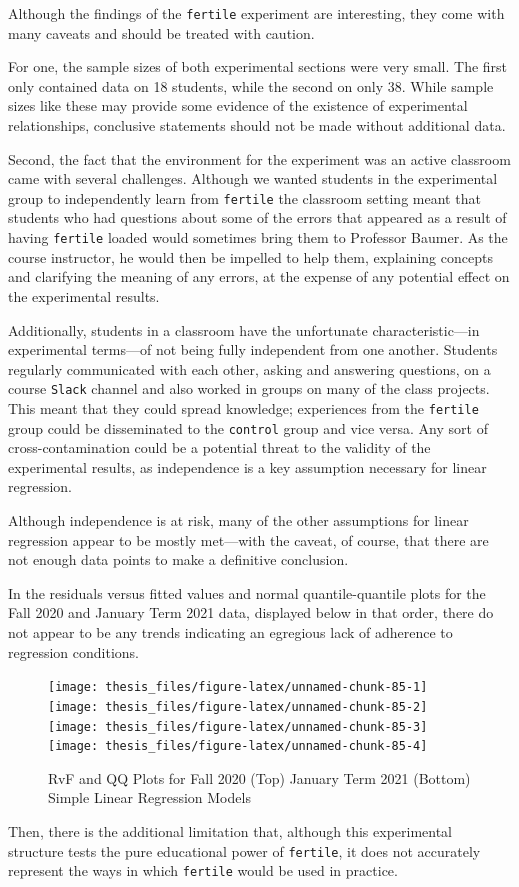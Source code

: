 \documentclass[12pt,twoside]{reedthesis}
\begin{document}
Although the findings of the \texttt{fertile} experiment are interesting, they come with many caveats and should be treated with caution.

For one, the sample sizes of both experimental sections were very small. The first only contained data on 18 students, while the second on only 38. While sample sizes like these may provide some evidence of the existence of experimental relationships, conclusive statements should not be made without additional data.

Second, the fact that the environment for the experiment was an active classroom came with several challenges. Although we wanted students in the experimental group to independently learn from \texttt{fertile} the classroom setting meant that students who had questions about some of the errors that appeared as a result of having \texttt{fertile} loaded would sometimes bring them to Professor Baumer. As the course instructor, he would then be impelled to help them, explaining concepts and clarifying the meaning of any errors, at the expense of any potential effect on the experimental results.

Additionally, students in a classroom have the unfortunate characteristic---in experimental terms---of not being fully independent from one another. Students regularly communicated with each other, asking and answering questions, on a course \texttt{Slack} channel and also worked in groups on many of the class projects. This meant that they could spread knowledge; experiences from the \texttt{fertile} group could be disseminated to the \texttt{control} group and vice versa. Any sort of cross-contamination could be a potential threat to the validity of the experimental results, as independence is a key assumption necessary for linear regression.

Although independence is at risk, many of the other assumptions for linear regression appear to be mostly met---with the caveat, of course, that there are not enough data points to make a definitive conclusion.

In the residuals versus fitted values and normal quantile-quantile plots for the Fall 2020 and January Term 2021 data, displayed below in that order, there do not appear to be any trends indicating an egregious lack of adherence to regression conditions.
\begin{figure}
\texttt{[image: thesis\_files/figure-latex/unnamed-chunk-85-1]} \texttt{[image: thesis\_files/figure-latex/unnamed-chunk-85-2]} \texttt{[image: thesis\_files/figure-latex/unnamed-chunk-85-3]} \texttt{[image: thesis\_files/figure-latex/unnamed-chunk-85-4]} \caption{RvF and QQ Plots for Fall 2020 (Top) January Term 2021 (Bottom) Simple Linear Regression Models}\label{fig:unnamed-chunk-85}
\end{figure}
Then, there is the additional limitation that, although this experimental structure tests the pure educational power of \texttt{fertile}, it does not accurately represent the ways in which \texttt{fertile} would be used in practice.
\end{document}
